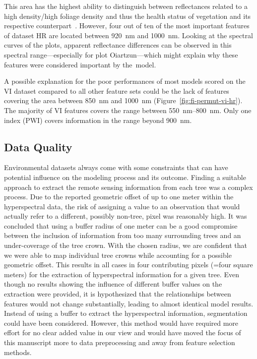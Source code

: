 \documentclass[remotesensing,article,accept,moreauthors,pdftex]{Definitions/mdpi}
\begin{document}
\begin{paracol}{2}
This area has the highest ability to distinguish between reflectances related to a high density/high foliage density and thus the health status of vegetation and its respective counterpart~\cite{horler1983}.
However, four out of ten of the most important features of dataset HR are located between 920~nm and 1000~nm.
Looking at the spectral curves of the plots, apparent reflectance differences can be observed in this spectral range---especially for plot Oiartzun---which might explain why these features were considered important by the~model.

A possible explanation for the poor performances of most models scored on the VI dataset compared to all other feature sets could be the lack of features covering the area between 850~nm and 1000~nm (Figure~\ref{fig:fi-permut-vi-hr}).
The majority of VI features covers the range between 550~nm--800~nm.
Only one index (PWI) covers information in the range beyond 900~nm.

\subsection{Data Quality}
\label{subsec:data-quality}

Environmental datasets always come with some constraints that can have potential influence on the modeling process and its outcome.
Finding a suitable approach to extract the remote sensing information from each tree was a complex process.
Due to the reported geometric offset of up to one meter within the hyperspectral data, the risk of assigning a value to an observation that would actually refer to a different, possibly non-tree, pixel was reasonably high.
It was concluded that using a buffer radius of one meter can be a good compromise between the inclusion of information from too many surrounding trees and an under-coverage of the tree crown.
With the chosen radius, we are confident that we were able to map individual tree crowns while accounting for a possible geometric offset.
This results in all cases in four contributing pixels (=four square meters) for the extraction of hyperspectral information for a given tree.
Even though no results showing the influence of different buffer values on the extraction were provided, it is hypothesized that the relationships between features would not change substantially, leading to almost identical model results.
Instead of using a buffer to extract the hyperspectral information, segmentation could have been considered.
However, this method would have required more effort for no clear added value in our view and would have moved the focus of this manuscript more to data preprocessing and away from feature selection methods.


\end{paracol}
\end{document}
